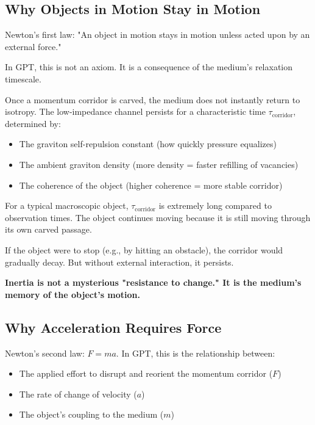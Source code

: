 \documentclass[12pt, a4paper]{article}
\begin{document}
\subsection{Why Objects in Motion Stay in Motion}
\label{subsec:newton_first}

Newton's first law: "An object in motion stays in motion unless acted upon by an external force."

In GPT, this is not an axiom. It is a consequence of the medium's relaxation timescale.

Once a momentum corridor is carved, the medium does not instantly return to isotropy. The low-impedance channel persists for a characteristic time \( \tau_{\text{corridor}} \), determined by:
\begin{itemize}
    \item The graviton self-repulsion constant (how quickly pressure equalizes)
    \item The ambient graviton density (more density = faster refilling of vacancies)
    \item The coherence of the object (higher coherence = more stable corridor)
\end{itemize}

For a typical macroscopic object, \( \tau_{\text{corridor}} \) is extremely long compared to observation times. The object continues moving because it is still moving through its own carved passage.

If the object were to stop (e.g., by hitting an obstacle), the corridor would gradually decay. But without external interaction, it persists.

\textbf{Inertia is not a mysterious "resistance to change." It is the medium's memory of the object's motion.}

\subsection{Why Acceleration Requires Force}
\label{subsec:newton_second}

Newton's second law: \( F = ma \). In GPT, this is the relationship between:
\begin{itemize}
    \item The applied effort to disrupt and reorient the momentum corridor (\( F \))
    \item The rate of change of velocity (\( a \))
    \item The object's coupling to the medium (\( m \))
\end{itemize}
\end{document}
